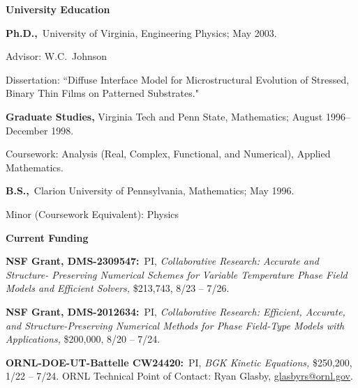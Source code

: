 \documentclass[11pt]{letter}
\begin{document}
	\smallskip
  
{\LARGE\bf  University Education}
    \begin{description}
    \item
\textbf{Ph.D.,}~University of Virginia, Engineering Physics; May 2003.
    \begin{description}
    \item
Advisor: W.C.~Johnson
    \item
Dissertation: ``Diffuse Interface Model for Microstructural Evolution of Stressed, Binary Thin Films on Patterned Substrates."
    \end{description}
    \item
 \textbf{Graduate Studies,} Virginia Tech and Penn State, Mathematics; August 1996--December 1998.
    \begin{description}
    \item
Coursework: Analysis (Real, Complex, Functional, and Numerical), Applied Mathematics.
    \end{description}
    \item
\textbf{B.S.,}~Clarion University of Pennsylvania, Mathematics; May
1996.
    \begin{description}
    \item
Minor (Coursework Equivalent): Physics
    \end{description}
    \end{description}
	
	\smallskip

	
{\LARGE\bf Current Funding}
    \begin{description}
    
	\item
\textbf{NSF Grant, DMS-2309547:}~PI, {\sl Collaborative Research: Accurate and Structure- Preserving Numerical Schemes for Variable Temperature Phase Field Models and Efficient Solvers,} \$213,743, 8/23 -- 7/26.
    
    \item
\textbf{NSF Grant, DMS-2012634:}~PI, {\sl Collaborative Research:  Efficient, Accurate, and Structure-Preserving Numerical Methods for Phase Field-Type Models with Applications,} \$200,000, 8/20 -- 7/24.

    \item
\textbf{ORNL-DOE-UT-Battelle CW24420:}~PI, {\sl BGK Kinetic Equations,} \$250,200, 1/22 -- 7/24. ORNL Technical Point of Contact: Ryan Glasby, \url{glasbyrs@ornl.gov}.
    
    \end{description}
    
\end{document}
